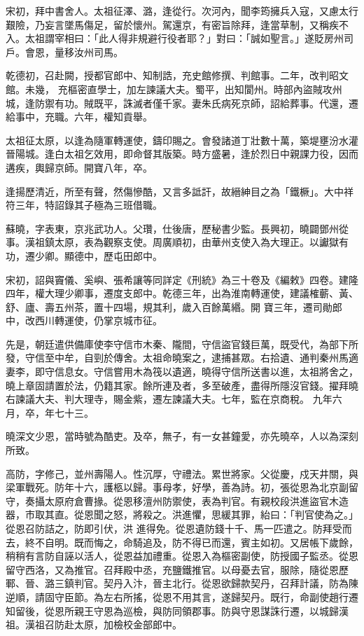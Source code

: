 \begin{pinyinscope}
 宋初，拜中書舍人。太祖征澤、潞，逢從行。次河內，聞李筠擁兵入寇，又慮太行艱險，乃妄言墜馬傷足，留於懷州。駕還京，有密旨除拜，逢當草制，又稱疾不入。太祖謂宰相曰：「此人得非規避行役者耶？」對曰：「誠如聖言。」遂貶房州司戶。會恩，量移汝州司馬。



 乾德初，召赴闕，授都官郎中、知制誥，充史館修撰、判館事。二年，改判昭文館。未幾，
 充樞密直學士，加左諫議大夫。蜀平，出知閬州。時部內盜賊攻州城，逢防禦有功。賊既平，誅滅者僅千家。妻朱氏病死京師，詔給葬事。代還，遷給事中，充職。六年，權知貢舉。



 太祖征太原，以逢為隨軍轉運使，鑄印賜之。會發諸道丁壯數十萬，築堤壅汾水灌晉陽城。逢白太祖乞效用，即命督其版築。時方盛暑，逢於烈日中親課力役，因而遘疾，輿歸京師。開寶八年，卒。



 逢揚歷清近，所至有聲，然傷慘酷，又言多詆訐，故縉紳目之為「鐵橛」。大中祥
 符三年，特詔錄其子極為三班借職。



 蘇曉，字表東，京兆武功人。父瓚，仕後唐，歷秘書少監。長興初，曉闢鄧州從事。漢祖鎮太原，表為觀察支使。周廣順初，由華州支使入為大理正。以讞獄有功，遷少卿。顯德中，歷屯田郎中。



 宋初，詔與竇儀、奚嶼、張希讓等同詳定《刑統》為三十卷及《編敕》四卷。建隆四年，權大理少卿事，遷度支郎中。乾德三年，出為淮南轉運使，建議榷蘄、黃、舒、廬、壽五州茶，置十四場，規其利，歲入百餘萬緡。開
 寶三年，遷司勛郎中，改西川轉運使，仍掌京城市征。



 先是，朝廷遣供備庫使李守信市木秦、隴間，守信盜官錢巨萬，既受代，為部下所發，守信至中牟，自剄於傳舍。太祖命曉案之，逮捕甚眾。右拾遺、通判秦州馬適妻李，即守信息女。守信嘗用木為筏以遺適，曉得守信所送書以進，太祖將舍之，曉上章固請置於法，仍籍其家。餘所連及者，多至破產，盡得所隱沒官錢。擢拜曉右諫議大夫、判大理寺，賜金紫，遷左諫議大夫。七年，監在京商稅。
 九年六月，卒，年七十三。



 曉深文少恩，當時號為酷吏。及卒，無子，有一女甚鐘愛，亦先曉卒，人以為深刻所致。



 高防，字修己，並州壽陽人。性沉厚，守禮法。累世將家。父從慶，戍天井關，與梁軍戰死。防年十六，護柩以歸。事母孝，好學，善為詩。初，張從恩為北京副留守，奏攝太原府倉曹掾。從恩移澶州防禦使，表為判官。有親校段洪進盜官木造器，市取其直。從恩聞之怒，將殺之。洪進懼，思緩其罪，紿曰：「判官使為之。」從恩召防詰之，防即引伏，洪
 進得免。從恩遺防錢十千、馬一匹遣之。防拜受而去，終不自明。既而悔之，命騎追及，防不得已而還，賓主如初。又居帳下歲餘，稍稍有言防自誣以活人，從恩益加禮重。從恩入為樞密副使，防授國子監丞。從恩留守西洛，又為推官。召拜殿中丞，充鹽鐵推官。以母憂去官，服除，隨從恩歷鄆、晉、潞三鎮判官。契丹入汴，晉主北行。從恩欲歸款契丹，召拜計議，防為陳逆順，請固守臣節。為左右所搖，從恩不用其言，遂歸契丹。既行，命副使趙行遷
 知留後，從恩所親王守恩為巡檢，與防同領郡事。防與守恩謀誅行遷，以城歸漢祖。漢祖召防赴太原，加檢校金部郎中。




\end{pinyinscope}
